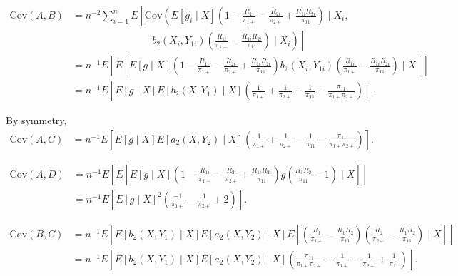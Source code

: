 \documentclass[12pt]{article}
\newcommand{\Cov}{{\text{Cov}}}
\begin{document}
\begin{itemize}
    \begin{align*}
      \Cov(A, B) &= n^{-2} \sum_{i = 1}^n E\left[\Cov\left(E[g_i \mid X] \left(1
      - \frac{R_{1i}}{\pi_{1+}} - \frac{R_{2i}}{\pi_{2+}} +
      \frac{R_{1i}R_{2i}}{\pi_{11}}\right) \mid X_i,\right. \right.\\
      &\qquad \qquad \qquad \qquad b_2(X_i, Y_{1i}) \left. \left.
      \left(\frac{R_{1i}}{\pi_{1+}} - \frac{R_{1i}R_{2i}}{\pi_{11}}\right) \mid
      X_i\right)\right]\\
      &= n^{-1} E\left[E\left[E[g \mid X] \left(1 - \frac{R_{1i}}{\pi_{1+}} -
      \frac{R_{2i}}{\pi_{2+}} + \frac{R_{1i}R_{2i}}{\pi_{11}}\right)
      b_2(X_i, Y_{1i}) \left(\frac{R_{1i}}{\pi_{1+}} -
      \frac{R_{1i}R_{2i}}{\pi_{11}}\right) \mid X \right]\right] \\
      &= n^{-1} E\left[E[g \mid X] E[b_2(X, Y_1) \mid X]
      \left(\frac{1}{\pi_{1+}} + \frac{1}{\pi_{2+}} - \frac{1}{\pi_{11}} -
      \frac{\pi_{11}}{\pi_{1+} \pi_{2+}}\right)\right].
    \end{align*}

    By symmetry,
    \begin{align*}
      \Cov(A, C) 
      &= n^{-1} E\left[E[g \mid X] E[a_2(X, Y_2) \mid X]
      \left(\frac{1}{\pi_{1+}} + \frac{1}{\pi_{2+}} - \frac{1}{\pi_{11}} -
      \frac{\pi_{11}}{\pi_{1+} \pi_{2+}}\right)\right].
    \end{align*}

    \begin{align*}
      \Cov(A, D) &= n^{-1} E\left[E\left[E[g \mid X] \left(1 -
      \frac{R_{1i}}{\pi_{1+}} - \frac{R_{2i}}{\pi_{2+}} +
      \frac{R_{1i}R_{2i}}{\pi_{11}}\right) g \left(\frac{R_1 R_2}{\pi_{11}} -
      1\right) \mid X\right] \right]\\
      &= n^{-1} E\left[E[g \mid X]^2 \left(\frac{-1}{\pi_{1+}} -
      \frac{1}{\pi_{2+}} + 2\right)\right].
    \end{align*}

    \begin{align*}
      \Cov(B, C) &= n^{-1} E\left[E[b_2(X, Y_1) \mid X] E[a_2(X, Y_2) \mid X]
      E\left[\left(\frac{R_1}{\pi_{1+}} - \frac{R_1 R_2}{\pi_{11}}\right)
      \left(\frac{R_2}{\pi_{2+}} - \frac{R_1 R_2}{\pi_{11}}\right) \mid
      X\right]\right]\\
      &= n^{-1} E\left[E[b_2(X, Y_1) \mid X] E[a_2(X, Y_2) \mid X]
      \left(\frac{\pi_{11}}{\pi_{1+} \pi_{2+}} - \frac{1}{\pi_{1+}} -
      \frac{1}{\pi_{2+}} + \frac{1}{\pi_{11}}\right)\right].
    \end{align*}


\end{itemize}
\end{document}
